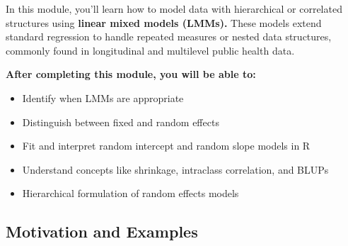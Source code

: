 \documentclass[
  letterpaper,
  DIV=11,
  numbers=noendperiod]{scrreprt}
\begin{document}
In this module, you'll learn how to model data with hierarchical or
correlated structures using \textbf{linear mixed models (LMMs).} These
models extend standard regression to handle repeated measures or nested
data structures, commonly found in longitudinal and multilevel public
health data.

\textbf{After completing this module, you will be able to:}

\begin{itemize}
\item
  Identify when LMMs are appropriate
\item
  Distinguish between fixed and random effects
\item
  Fit and interpret random intercept and random slope models in R
\item
  Understand concepts like shrinkage, intraclass correlation, and BLUPs
\item
  Hierarchical formulation of random effects models
\end{itemize}

\hypertarget{motivation-and-examples-1}{%
\subsection*{Motivation and Examples}\label{motivation-and-examples-1}}
\end{document}
